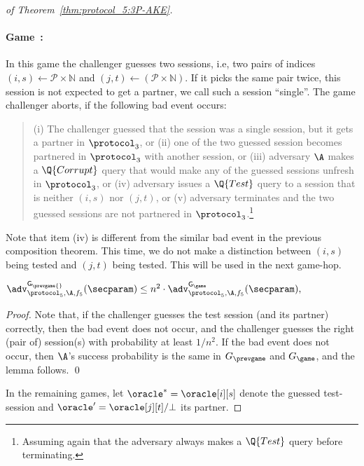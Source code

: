 \begin{proof}[of Theorem~\ref{thm:protocol_5:3P-AKE}]
\paragraph{Game~\game:}
In this game the challenger guesses two sessions, i.e, two pairs of indices $(i,s) \gets \mathcal{P} \times \mathbb{N}$ and $(j,t) \gets (\mathcal{P} \times \mathbb{N})$. 
If it picks the same pair twice, this session is not expected to get a partner, we call such a session ``single''. The game challenger aborts, if the following bad event occurs:
\begin{quote}
(i) The  challenger guessed that the session was a single session, but it gets a partner in $\protocol_3$, or (ii) one of the two guessed session becomes partnered in $\protocol_3$ with another session, or (iii) adversary $\A$ makes a $\Q{Corrupt}$ query that would make any of the guessed sessions unfresh in $\protocol_3$, or (iv) adversary issues a $\Q{Test}$ query to a session that is neither $(i,s)$ nor $(j,t)$, or (v) adversary terminates and the two guessed sessions are not partnered in $\protocol_3$.\footnote{Assuming again that the adversary always makes a $\Q{Test}$ query before terminating.}
\end{quote}

\noindent
Note that item (iv) is different from the similar bad event in the previous composition theorem.
This time, we do not make a distinction between $(i,s)$ being tested and $(j,t)$ being tested. 
This will be used in the next game-hop.
\begin{lemma}
$
	\adv_{\protocol_5,\A,f_5}^{\mathsf{G_{\prevgame{}}}}(\secparam) 
	\leq n^2 \cdot \adv_{\protocol_5,\A,f_5}^{\mathsf{G_\game}}(\secparam),
$
\end{lemma}

\begin{proof}
Note that, if the challenger guesses the test session (and its partner) correctly, 
then the bad event does not occur, and the challenger guesses the right (pair of) session(s) with probability at least $1 / n^2$. 
If the bad event does not occur, then $\A$'s success probability is the same in $G_{\prevgame}$ and $G_{\game}$, and the lemma follows.
\qed
\end{proof}
In the remaining games,
let $\oracle^* = \oracle[i][s]$ denote the guessed test-session and $\oracle' = \oracle[j][t]/\bot$ its partner.


\end{proof}
